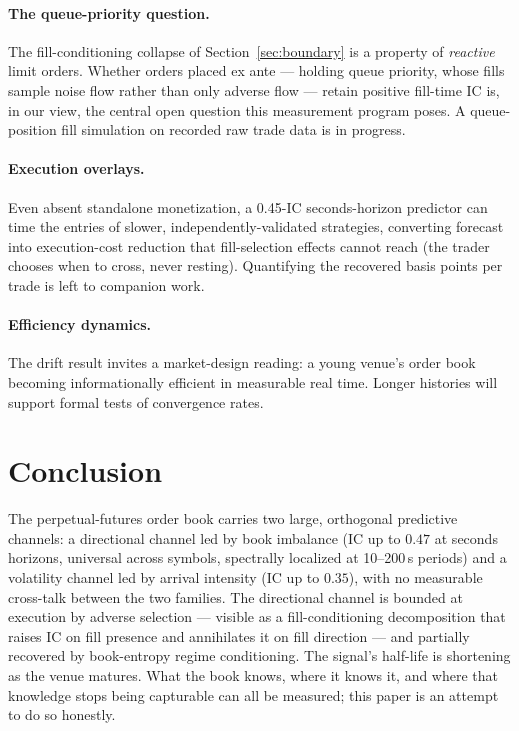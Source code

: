 \documentclass[11pt,a4paper]{article}
\theoremstyle{definition}
\theoremstyle{plain}
\begin{document}
\paragraph{The queue-priority question.} The fill-conditioning
collapse of Section~\ref{sec:boundary} is a property of
\emph{reactive} limit orders. Whether orders placed ex ante ---
holding queue priority, whose fills sample noise flow rather than only
adverse flow \citep{moallemi2016} --- retain positive fill-time IC is,
in our view, the central open question this measurement program poses.
A queue-position fill simulation on recorded raw trade data is in
progress.

\paragraph{Execution overlays.} Even absent standalone monetization,
a 0.45-IC seconds-horizon predictor can time the entries of slower,
independently-validated strategies, converting forecast into
execution-cost reduction that fill-selection effects cannot reach
(the trader chooses when to cross, never resting). Quantifying the
recovered basis points per trade is left to companion work.

\paragraph{Efficiency dynamics.} The drift result invites a
market-design reading: a young venue's order book becoming
informationally efficient in measurable real time. Longer histories
will support formal tests of convergence rates.

\section{Conclusion}\label{sec:conclusion}

The perpetual-futures order book carries two large, orthogonal
predictive channels: a directional channel led by book imbalance
(IC up to $0.47$ at seconds horizons, universal across symbols,
spectrally localized at 10--200\,s periods) and a volatility channel
led by arrival intensity (IC up to $0.35$), with no measurable
cross-talk between the two families. The directional channel is
bounded at execution by adverse selection --- visible as a
fill-conditioning decomposition that raises IC on fill presence and
annihilates it on fill direction --- and partially recovered by
book-entropy regime conditioning. The signal's half-life is shortening
as the venue matures. What the book knows, where it knows it, and
where that knowledge stops being capturable can all be measured; this
paper is an attempt to do so honestly.
\end{document}
